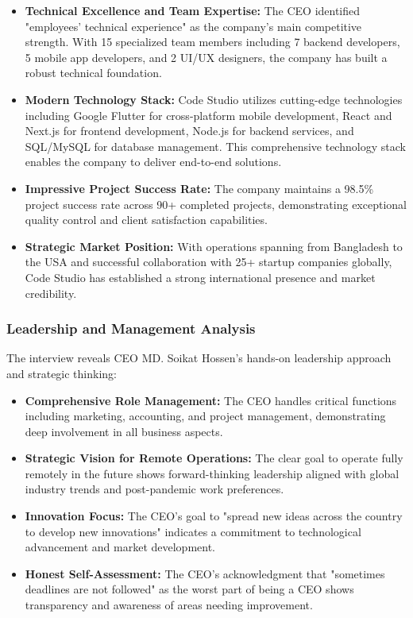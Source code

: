 \documentclass[12pt,a4paper]{article}
\begin{document}
\begin{itemize}
    \item \textbf{Technical Excellence and Team Expertise:} The CEO identified "employees' technical experience" as the company's main competitive strength. With 15 specialized team members including 7 backend developers, 5 mobile app developers, and 2 UI/UX designers, the company has built a robust technical foundation.
    
    \item \textbf{Modern Technology Stack:} Code Studio utilizes cutting-edge technologies including Google Flutter for cross-platform mobile development, React and Next.js for frontend development, Node.js for backend services, and SQL/MySQL for database management. This comprehensive technology stack enables the company to deliver end-to-end solutions.
    
    \item \textbf{Impressive Project Success Rate:} The company maintains a 98.5\% project success rate across 90+ completed projects, demonstrating exceptional quality control and client satisfaction capabilities.
    
    \item \textbf{Strategic Market Position:} With operations spanning from Bangladesh to the USA and successful collaboration with 25+ startup companies globally, Code Studio has established a strong international presence and market credibility.
\end{itemize}

\subsubsection{Leadership and Management Analysis}

The interview reveals CEO MD. Soikat Hossen's hands-on leadership approach and strategic thinking:

\begin{itemize}
    \item \textbf{Comprehensive Role Management:} The CEO handles critical functions including marketing, accounting, and project management, demonstrating deep involvement in all business aspects.
    
    \item \textbf{Strategic Vision for Remote Operations:} The clear goal to operate fully remotely in the future shows forward-thinking leadership aligned with global industry trends and post-pandemic work preferences.
    
    \item \textbf{Innovation Focus:} The CEO's goal to "spread new ideas across the country to develop new innovations" indicates a commitment to technological advancement and market development.
    
    \item \textbf{Honest Self-Assessment:} The CEO's acknowledgment that "sometimes deadlines are not followed" as the worst part of being a CEO shows transparency and awareness of areas needing improvement.
\end{itemize}
\end{document}
